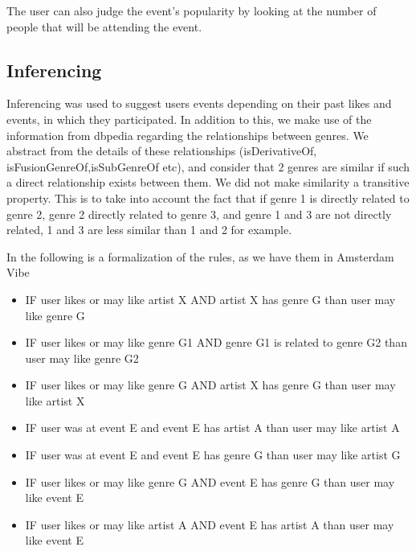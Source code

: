 \documentclass[12pt, a4paper, lithuanian]{article}
\begin{document}
The user can also judge the event’s popularity by looking at the number of people that will be attending the event.

\subsection{Inferencing}

Inferencing was used to suggest users events depending on their past likes and events, in which they participated. In addition to this, we make use of the information from dbpedia regarding the relationships between genres. We abstract from the details of these relationships (isDerivativeOf, isFusionGenreOf,isSubGenreOf etc), and consider that 2 genres are similar if such a direct relationship exists between them. We did not make similarity a transitive property. This is to take into account the fact that if genre 1 is directly related to genre 2, genre 2 directly related to genre 3, and genre 1 and 3 are not directly related, 1 and 3 are less similar than 1 and 2 for example. 

In the following is a formalization of the rules, as we have them in Amsterdam Vibe

\begin{itemize}
  
    \item IF user likes or may like artist X AND artist X has genre G than user may like genre G

    \item IF user likes or may like genre G1 AND genre G1 is related to genre G2 than user may like genre G2

    \item IF user likes or may like genre G AND artist X has genre G than user may like artist X

    \item IF user was at event E and event E has artist A than user may like artist A
 
    \item IF user was at event E and event E has genre G than user may like artist G

    \item IF user likes or may like genre G AND event E has genre G than user may like event E

    \item IF user likes or may like artist A AND event E has artist A than user may like event E


\end{itemize}
\end{document}
